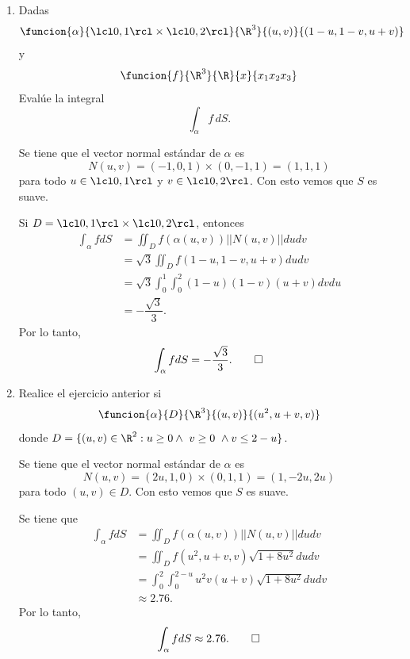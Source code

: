 \documentclass[a4,11pt]{aleph-examen}
\begin{document}
\begin{preguntas}
\begin{respuesta}
\begin{respuesta}
\begin{respuesta}
\begin{enumerate}
\item 
	Dadas
	\[
		\funcion{\alpha}{\lcl0,1\rcl \times \lcl0,2\rcl}{\R^3}{(u,v)}{(1-u,1-v,u+v)}
	\]
	y
	\[
		\funcion{f}{\R^3}{\R}{x}{x_1 x_2 x_3}
	\]
	Evalúe la integral
	\[
		\int_\alpha f\, dS.
	\]

\begin{respuesta}
	Se tiene que el vector normal estándar de $\alpha$ es
	\[
		N(u,v)=(-1,0,1)\times (0,-1,1)= (1,1,1)
	\]
	para todo $u\in \lcl0,1\rcl$ y $v\in\lcl0,2\rcl$. Con esto vemos que $S$ es suave. 

	Si $D=\lcl0,1\rcl \times \lcl0,2\rcl$, entonces
	\begin{align*}
		\int_\alpha f dS
			&=\iint_D f(\alpha(u,v))||N(u,v)|| du dv\\
			&=\sqrt 3\iint_D f(1-u,1-v,u+v) du dv\\
			&=\sqrt 3\int_0 ^1 \int_0 ^2  (1-u)(1-v)(u+v) dv du\\
			&=-\dfrac{\sqrt 3}{3}.
	\end{align*}
	Por lo tanto,
	\[
		\int_\alpha f dS
		=-\dfrac{\sqrt 3}{3}. \qedhere
	\]
\end{respuesta}

\item 
	Realice el ejercicio anterior si 
	\[
		\funcion{\alpha}{D}{\R^3}{(u,v)}{(u^2,u+v,v)}
	\]
	donde $D=\{(u,v)\in\R^2: u\geq0\wedge \ v\geq 0 \ \wedge v\leq 2-u\}$.
	
\begin{respuesta}
	Se tiene que el vector normal estándar de $\alpha$ es
	\[
		N(u,v)=(2u,1,0)\times (0,1,1)= (1, -2 u, 2 u)
	\]
	para todo $(u,v)\in D$. Con esto vemos que $S$ es suave. 
		
	Se tiene que
	\begin{align*}
		\int_\alpha f dS
			&=\iint_D f(\alpha(u,v))||N(u,v)|| du dv\\
			&=\iint_D f(u^2,u+v,v) \sqrt{1+8u^2}du dv\\
			&=\int_0^2 \int_0^{2-u} u^2 v(u+v) \sqrt{1+8u^2}du dv\\
			&\approx 2.76.
	\end{align*}
	Por lo tanto,
	\[
		\int_\alpha f dS
		\approx 2.76.
		\qedhere
	\]
\end{respuesta}




\end{enumerate}
\end{respuesta}
\end{respuesta}
\end{respuesta}
\end{preguntas}
\end{document}
